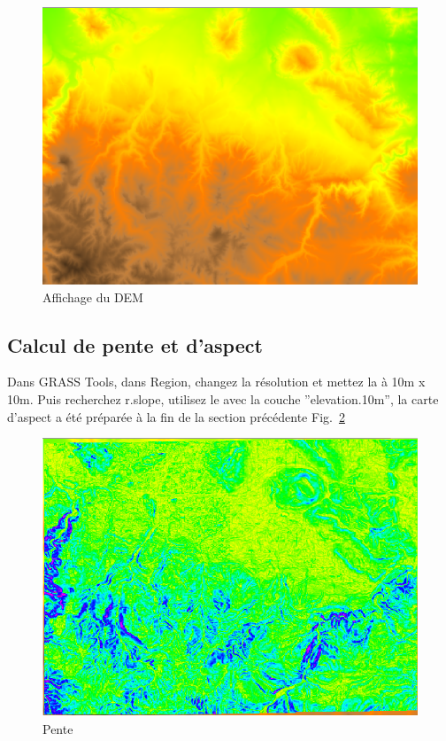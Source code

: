 \begin{figure}[htbp]
   \centering
   \includegraphics[scale=0.35]{grass009.png}
   \caption{Affichage du DEM}
   \label{fig:grass009}
\end{figure}

\subsection{Calcul de pente et d'aspect}
Dans GRASS Tools, dans Region, changez la r\'esolution et mettez la \`a 10m x 10m. Puis recherchez r.slope, utilisez le avec la couche ''elevation.10m'', la carte d'aspect a \'et\'e pr\'epar\'ee \`a la fin de la section pr\'ec\'edente Fig.~\ref{fig:grass010}

\begin{figure}[htbp]
   \centering
   \includegraphics[scale=0.35]{grass010.png}
   \caption{Pente}
   \label{fig:grass010}
\end{figure}

